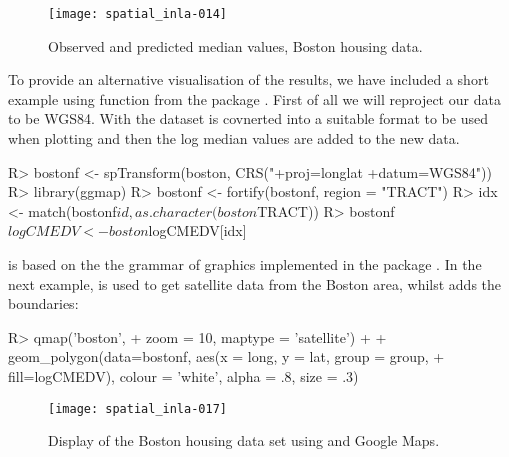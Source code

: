 \documentclass[article]{jss}
\begin{document}
\begin{figure}[h!]
\begin{center}
\texttt{[image: spatial\_inla-014]}
\end{center}
\caption{Observed and predicted median values, Boston housing data.}
\label{fig:spplot}
\end{figure}

To provide an alternative visualisation of the results, we have included a
short example using function  from the  package
\citep{KahleWickham:2013}.  First of all we will reproject our data to be
WGS84. With  the  dataset is covnerted into a
suitable format to be used when plotting and then the log median values are
added to the new data.



\begin{Schunk}
\begin{Sinput}
R> bostonf <- spTransform(boston, CRS("+proj=longlat +datum=WGS84"))
R> library(ggmap)
R> bostonf <- fortify(bostonf, region = "TRACT")
R> idx <- match(bostonf$id, as.character(boston$TRACT))
R> bostonf$logCMEDV <- boston$logCMEDV[idx]
\end{Sinput}
\end{Schunk}
\noindent
{} is based on the the grammar of graphics implemented in the
 package \citep{Wickham:2009}. In the next example,
 is used to get satellite data from the Boston area,
whilst  adds the boundaries:

\begin{Schunk}
\begin{Sinput}
R> qmap('boston',
+     zoom = 10, maptype = 'satellite') +
+  geom_polygon(data=bostonf, aes(x = long, y = lat, group = group, 
+     fill=logCMEDV), colour = 'white', alpha = .8, size = .3)
\end{Sinput}
\end{Schunk}

\begin{figure}[h!]
\begin{center}
\texttt{[image: spatial\_inla-017]}
\caption{Display of the Boston housing data set using 
and Google Maps.} 
\label{fig:ggmap}
\end{center}
\end{figure}
\end{document}
